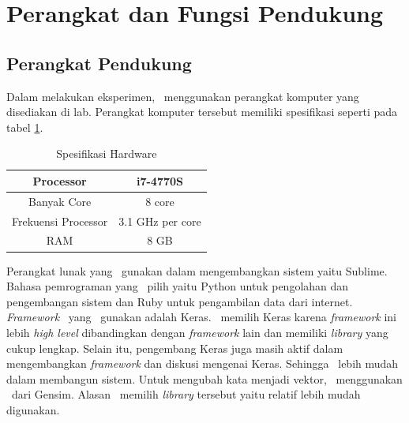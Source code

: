 \section{Perangkat dan Fungsi Pendukung}
  \subsection{Perangkat Pendukung}
  Dalam melakukan eksperimen, \saya~menggunakan perangkat komputer yang disediakan di lab. Perangkat komputer tersebut memiliki spesifikasi seperti pada tabel \ref{table:spesifikasi hardware}.

  \begin{table}
    \centering
    \caption{Spesifikasi \f{Hardware}}
    \begin{tabular}{|c|c|}
      \hline
      Processor & i7-4770S \\ \hline
      Banyak Core & 8 core \\ \hline
      Frekuensi Processor & 3.1 GHz per core \\ \hline
      RAM & 8 GB \\ \hline
    \end{tabular}
    \label{table:spesifikasi hardware}
  \end{table}

   Perangkat lunak yang \saya~gunakan dalam mengembangkan sistem yaitu Sublime. Bahasa pemrograman yang \saya~pilih yaitu Python untuk pengolahan dan pengembangan sistem dan Ruby untuk pengambilan data dari internet. \textit{Framework} \rnn~yang \saya~gunakan adalah Keras. \Saya~memilih Keras karena \textit{framework} ini lebih \textit{high level} dibandingkan dengan \textit{framework} lain dan memiliki \textit{library} yang cukup lengkap. Selain itu, pengembang Keras juga masih aktif dalam mengembangkan \textit{framework} dan diskusi mengenai Keras. Sehingga \saya~lebih mudah dalam membangun sistem. Untuk mengubah kata menjadi vektor, \saya~menggunakan \we~dari Gensim. Alasan \saya~memilih \textit{library} tersebut yaitu relatif lebih mudah digunakan.

